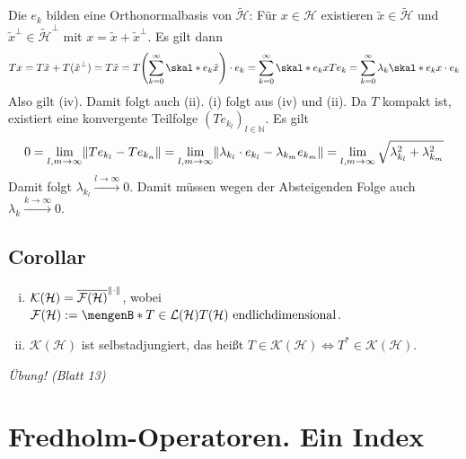 Die $e_k$ bilden eine Orthonormalbasis von $\tilde{\mathcal{H}}$: Für $x \in \mathcal{H}$ existieren $\tilde{x} \in \tilde{\mathcal{H}}$ und $\tilde{x}^\bot \in \tilde{\mathcal{H}}^\bot$ mit $x= \tilde{x} + \tilde{x}^\bot$. Es gilt dann 
\[
	T x = T \tilde{x} + T(\tilde{x}^\bot) = T \tilde{x} = T \enbrace*{\sum_{k=0}^{\infty} \skal*{e_k}{\tilde{x}}} \cdot e_k = \sum_{k=0}^{\infty} \skal*{e_k}{x} T e_k
	= \sum_{k=0}^{\infty} \lambda_k \skal*{e_k}{x} \cdot e_k 
\]
Also gilt (iv). Damit folgt auch (ii). (i) folgt aus (iv) und (ii). Da $T$ kompakt ist, existiert eine konvergente Teilfolge $(T e_{k_l})_{l \in \mathds{N}}$. Es gilt
\[
	0=\lim_{l,m \to \infty} \norm{T e_{k_l} - T e_{k_n}} = \lim_{l,m \to \infty} \norm{\lambda_{k_l} \cdot e_{k_l} - \lambda_{k_m} e_{k_m}} = 
	\lim_{l,m \to \infty}  \sqrt{\lambda_{k_l}^2 + \lambda_{k_m}^2}  
\]
Damit folgt $\lambda_{k_l} \xrightarrow{l \to \infty} 0$. Damit müssen wegen der Absteigenden Folge auch $\lambda_k \xrightarrow{k \to \infty} 0$. \bewende

\subsection{Corollar} %
\label{sub:811}
\begin{enumerate}[(i)]
	\item $\mathcal{K}(\mathcal{H})= \overline{\mathcal{F}(\mathcal{H})}^{\norm{\cdot}}$, wobei 
	$\mathcal{F}(\mathcal{H}) := \set[T \in \mathcal{L}(\mathcal{H})]{T(\mathcal{H}) \text{ endlichdimensional}}$.
	\item $\mathcal{K}(\mathcal{H})$ ist selbstadjungiert, das heißt $T \in \mathcal{K}(\mathcal{H}) \iff T^* \in \mathcal{K}(\mathcal{H})$.
\end{enumerate}
\emph{Übung! (Blatt 13)} \bewende
\newpage

\section{Fredholm-Operatoren. Ein Index} %
\label{sec:9}

